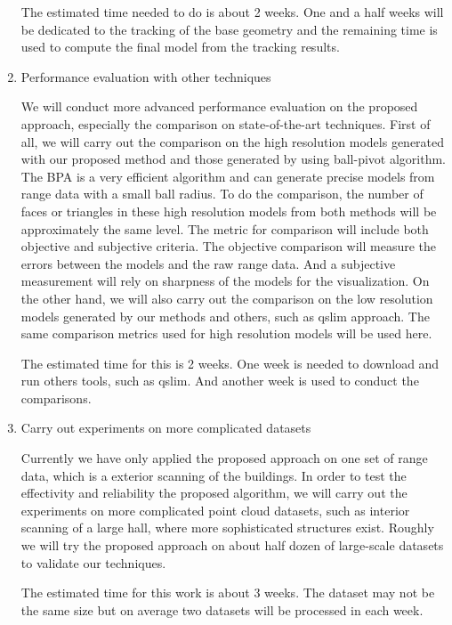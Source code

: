 \documentclass[12pt,letterpaper]{article}
\begin{document}
\begin{enumerate}
The estimated time needed to do is about 2 weeks.
One and a half weeks will be dedicated to the tracking of the base geometry
and the remaining time is used to compute the final model from the tracking results.

\item Performance evaluation with other techniques

We will conduct more advanced performance evaluation on the proposed approach, especially the
comparison on state-of-the-art techniques.
First of all, we will carry out the comparison on the high resolution models
generated with our proposed method and those generated by using ball-pivot algorithm.
The BPA is a very efficient algorithm and can generate precise models from range data with
a small ball radius.
To do the comparison, the number of faces or triangles in these high resolution models
from both methods will be approximately the same level.
The metric for comparison will include both objective and subjective criteria. The objective
comparison will measure the errors between the models and the raw range data.
And a subjective measurement will rely on sharpness of the models for the visualization.
On the other hand, we will also carry out the comparison on the low resolution models
generated by our methods and others, such as qslim approach.
The same comparison metrics used for high resolution models will be used here.

The estimated time for this is 2 weeks.
One week is needed to download and run others tools, such as qslim.
And another week is used to conduct the comparisons.

\item Carry out experiments on more complicated datasets

Currently we have only applied the proposed approach on one set of range data, which is a
exterior scanning of the buildings.
In order to test the effectivity and reliability the proposed algorithm,
we will carry out the experiments on more complicated point cloud datasets, such as
interior scanning of a large hall, where more sophisticated structures exist.
Roughly we will try the proposed approach on about half dozen of large-scale datasets to
validate our techniques.

The estimated time for this work is about 3 weeks.
The dataset may not be the same size but on average two datasets will be processed in each week.


\end{enumerate}


\end{document}
